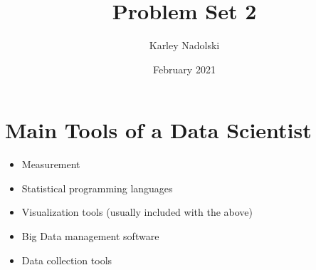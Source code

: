 \documentclass{article}
\title{Problem Set 2}
\author{Karley Nadolski}
\date{February 2021}
\begin{document}
\maketitle

\section{Main Tools of a Data Scientist}

\begin{itemize}
    \item Measurement
    \item Statistical programming languages
    \item Visualization tools (usually included with the above)
    \item Big Data management software
    \item Data collection tools
\end{itemize}
\end{document}
